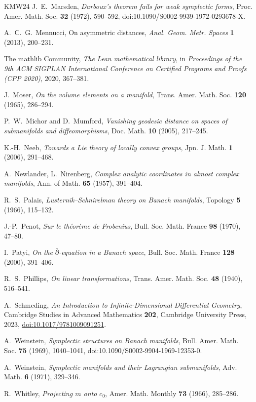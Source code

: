\begin{thebibliography}{KMW24}
J.~E.~Marsden, \emph{Darboux's theorem fails for weak symplectic forms}, Proc. Amer. Math. Soc.
\textbf{32} (1972), 590--592, doi:10.1090/S0002-9939-1972-0293678-X.

A.~C.~G.~Mennucci, On asymmetric distances, \emph{Anal. Geom. Metr. Spaces} \textbf{1} (2013),
200--231.

The mathlib Community, \emph{The Lean mathematical library}, in \emph{Proceedings of the 9th ACM
SIGPLAN International Conference on Certified Programs and Proofs (CPP 2020)}, 2020, 367--381.

J.~Moser, \emph{On the volume elements on a manifold}, Trans. Amer. Math. Soc. \textbf{120}
(1965), 286--294.

P.~W.~Michor and D.~Mumford, \emph{Vanishing geodesic distance on spaces of submanifolds and
diffeomorphisms}, Doc. Math. \textbf{10} (2005), 217--245.

K.-H.~Neeb, \emph{Towards a Lie theory of locally convex groups}, Jpn. J. Math. \textbf{1}
(2006), 291--468.

A.~Newlander, L.~Nirenberg, \emph{Complex analytic coordinates in almost complex manifolds},
Ann. of Math. \textbf{65} (1957), 391--404.

R.~S.~Palais, \emph{Lusternik--Schnirelman theory on Banach manifolds}, Topology \textbf{5}
(1966), 115--132.

J.-P.~Penot, \emph{Sur le théorème de Frobenius}, Bull. Soc. Math. France \textbf{98} (1970),
47--80.

I.~Patyi, \emph{On the $\bar\partial$-equation in a Banach space}, Bull. Soc. Math. France
\textbf{128} (2000), 391--406.

R.~S.~Phillips, \emph{On linear transformations}, Trans. Amer. Math. Soc. \textbf{48} (1940),
516--541.

A.~Schmeding, \emph{An Introduction to Infinite-Dimensional Differential Geometry}, Cambridge
Studies in Advanced Mathematics \textbf{202}, Cambridge University Press, 2023,
\href{https://doi.org/10.1017/9781009091251}{doi:10.1017/9781009091251}.

A.~Weinstein, \emph{Symplectic structures on Banach manifolds}, Bull. Amer. Math. Soc.
\textbf{75} (1969), 1040--1041, doi:10.1090/S0002-9904-1969-12353-0.

A.~Weinstein, \emph{Symplectic manifolds and their Lagrangian submanifolds}, Adv. Math.
\textbf{6} (1971), 329--346.

R.~Whitley, \emph{Projecting $m$ onto $c_0$}, Amer. Math. Monthly \textbf{73} (1966), 285--286.

\end{thebibliography}
